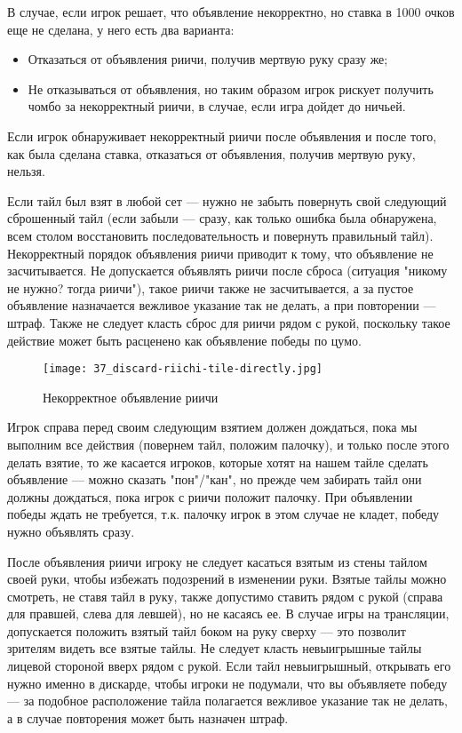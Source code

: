 В случае, если игрок решает, что объявление некорректно, но ставка в 1000 очков еще не сделана, у него есть два варианта:
\begin{itemize}
	\item Отказаться от объявления риичи, получив мертвую руку сразу же;
	\item Не отказываться от объявления, но таким образом игрок рискует получить чомбо за некорректный риичи, в случае, если игра дойдет до ничьей.
\end{itemize}

Если игрок обнаруживает некорректный риичи после объявления и после того, как была сделана ставка, отказаться от объявления, получив мертвую руку, нельзя.

Если тайл был взят в любой сет --- нужно не забыть повернуть свой следующий сброшенный тайл (если забыли --- сразу, как только ошибка была обнаружена, всем столом восстановить последовательность и повернуть правильный тайл). Некорректный порядок объявления риичи приводит к тому, что объявление не засчитывается. Не допускается объявлять риичи после сброса (ситуация "никому не нужно? тогда риичи"), такое риичи также не засчитывается, а за пустое объявление назначается вежливое указание так не делать, а при повторении --- штраф. Также не следует класть сброс для риичи рядом с рукой, поскольку такое действие может быть расценено как объявление победы по цумо.

\begin{figure}[H]
	\centering
	\texttt{[image: 37\_discard-riichi-tile-directly.jpg]}
	\caption{Некорректное объявление риичи}
\end{figure}

Игрок справа перед своим следующим взятием должен дождаться, пока мы выполним все действия (повернем тайл, положим палочку), и только после этого делать взятие, то же касается игроков, которые хотят на нашем тайле сделать объявление --- можно сказать "пон"/"кан", но прежде чем забирать тайл они должны дождаться, пока игрок с риичи положит палочку. При объявлении победы ждать не требуется, т.к. палочку игрок в этом случае не кладет, победу нужно объявлять сразу.

После объявления риичи игроку не следует касаться взятым из стены тайлом своей руки, чтобы избежать подозрений в изменении руки. Взятые тайлы можно смотреть, не ставя тайл в руку, также допустимо ставить рядом с рукой (справа для правшей, слева для левшей), но не касаясь ее. В случае игры на трансляции, допускается положить взятый тайл боком на руку сверху --- это позволит зрителям видеть все взятые тайлы. Не следует класть невыигрышные тайлы лицевой стороной вверх рядом с рукой. Если тайл невыигрышный, открывать его нужно именно в дискарде, чтобы игроки не подумали, что вы объявляете победу --- за подобное расположение тайла полагается вежливое указание так не делать, а в случае повторения может быть назначен штраф.

